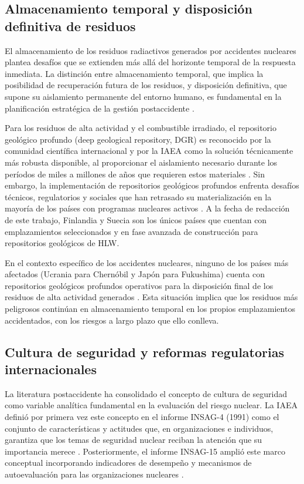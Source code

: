 \subsection{Almacenamiento temporal y disposición definitiva de residuos}

El almacenamiento de los residuos radiactivos generados por accidentes nucleares
plantea desafíos que se extienden más allá del horizonte temporal de la respuesta
inmediata. La distinción entre almacenamiento temporal, que implica la posibilidad
de recuperación futura de los residuos, y disposición definitiva, que supone su
aislamiento permanente del entorno humano, es fundamental en la planificación
estratégica de la gestión postaccidente \cite{IAEAWSR62021}.

Para los residuos de alta actividad y el combustible irradiado, el repositorio
geológico profundo (deep geological repository, DGR) es reconocido por la
comunidad científica internacional y por la IAEA como la solución técnicamente
más robusta disponible, al proporcionar el aislamiento necesario durante los
períodos de miles a millones de años que requieren estos materiales
\cite{Chapman2002}. Sin embargo, la implementación de repositorios geológicos
profundos enfrenta desafíos técnicos, regulatorios y sociales que han retrasado
su materialización en la mayoría de los países con programas nucleares activos
\cite{Chapman2002}. A la fecha de redacción de este trabajo, Finlandia y Suecia
son los únicos países que cuentan con emplazamientos seleccionados y en fase
avanzada de construcción para repositorios geológicos de HLW.

En el contexto específico de los accidentes nucleares, ninguno de los países
más afectados (Ucrania para Chernóbil y Japón para Fukushima) cuenta con
repositorios geológicos profundos operativos para la disposición final de los
residuos de alta actividad generados \cite{IAEAWSR62021}. Esta situación implica
que los residuos más peligrosos continúan en almacenamiento temporal en los
propios emplazamientos accidentados, con los riesgos a largo plazo que ello
conlleva.

\subsection{Cultura de seguridad y reformas regulatorias internacionales}

La literatura postaccidente ha consolidado el concepto de cultura de seguridad
como variable analítica fundamental en la evaluación del riesgo nuclear. La IAEA
definió por primera vez este concepto en el informe INSAG-4 (1991) como el
conjunto de características y actitudes que, en organizaciones e individuos,
garantiza que los temas de seguridad nuclear reciban la atención que su
importancia merece \cite{INSAG4}. Posteriormente, el informe INSAG-15 amplió
este marco conceptual incorporando indicadores de desempeño y mecanismos de
autoevaluación para las organizaciones nucleares \cite{INSAG15}.

